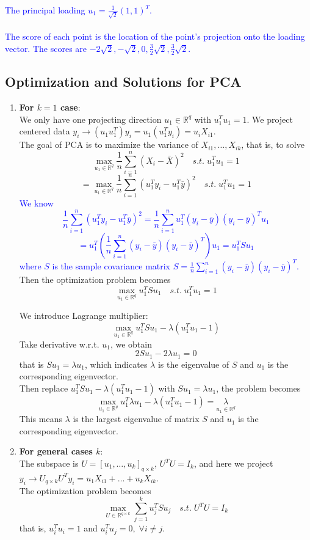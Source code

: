 \documentclass[12pt]{book}
\theoremstyle{definition}
\theoremstyle{remark}
\newcommand{\R}{\mathbb{R}}
\begin{document}
\textcolor{blue}{
The principal loading $u_1 = \frac{1}{\sqrt{2}}(1,1)^T$.\\
\\
The score of each point is the location of the point's projection onto the loading vector. The scores are $-2\sqrt{2}, -\sqrt{2}, 0, \frac{3}{2}\sqrt{2}, \frac{3}{2}\sqrt{2}$.
}

\subsection{Optimization and Solutions for PCA}
\begin{enumerate}
    \item \textbf{For $k = 1$ case}:\\
    We only have one projecting direction $u_1\in \R^q$ with $u_1^Tu_1 = 1$. We project centered data $y_i \rightarrow(u_1u_1^T)y_i = u_1(u_1^Ty_i) = u_iX_{i1}$.\\
    The goal of PCA is to maximize the variance of $X_{i1}, \dots, X_{ik}$, that is, to solve \[\underset{u_1\in\R^q}{\max}\frac{1}{n}\sum_{i=1}^n(X_i - \bar{X})^2 \quad s.t.\;u_1^Tu_1 = 1\] \[=\underset{u_1\in\R^q}{\max}\frac{1}{n}\sum_{i=1}^n(u_1^Ty_i - u_1^T\bar{y})^2 \quad s.t.\;u_1^Tu_1 = 1\]
    \textcolor{blue}{
    We know \[\frac{1}{n}\sum_{i=1}^n(u_1^Ty_i - u_1^T\bar{y})^2 = \frac{1}{n}\sum_{i=1}^nu_1^T(y_i-\bar{y})(y_i-\bar{y})^Tu_1\]
    \[ = u_1^T\left(\frac{1}{n}\sum_{i=1}^n(y_i-\bar{y})(y_i-\bar{y})^T\right)u_1 = u_1^TSu_1\]
    where $S$ is the sample covariance matrix $S = \frac{1}{n}\sum_{i=1}^n(y_i-\bar{y})(y_i-\bar{y})^T$.\\
    }
    Then the optimization problem becomes \[\underset{u_1\in\R^q}{\max} u_1^TSu_1 \quad s.t.\;u_1^Tu_1 = 1\]
    
    We introduce Lagrange multiplier:
    \[\underset{u_1\in\R^q}{\max}u_1^TSu_1 -\lambda(u_1^Tu_1-1)\]
    Take derivative w.r.t. $u_1$, we obtain 
    \[2Su_1 - 2\lambda u_1 = 0\]
    that is $Su_1  = \lambda u_1$, which indicates $\lambda$ is the eigenvalue of $S$ and $u_1$ is the corresponding eigenvector.\\
    Then replace $u_1^TSu_1 -\lambda(u_1^Tu_1-1)$ with $Su_1  = \lambda u_1$, the problem becomes
    \[\underset{u_1\in\R^q}{\max}u_1^T\lambda u_1 -\lambda(u_1^Tu_1-1) = \underset{u_1\in\R^q} \lambda\]
    This means $\lambda$ is the largest eigenvalue of matrix $S$ and $u_1$ is the corresponding eigenvector.
    
    \item \textbf{For general cases $k$}:\\
    The subspace is $U = [u_1, \dots, u_k]_{q\times k}$, $U^TU = I_k$, and here we project $y_i \rightarrow U_{q\times k}U^Ty_i = u_1X_{i1}+\dots+u_kX_{ik}$. \\
    The optimization problem becomes
    \[\underset{U\in\R^{q\times k}}{\max} \sum_{j=1}^k u_j^TSu_j \quad s.t.\;U^TU = I_k\]
    that is, $u_i^Tu_i = 1$ and $u_i^Tu_j = 0, \; \forall i \ne j$.\\


\end{enumerate}
\end{document}
